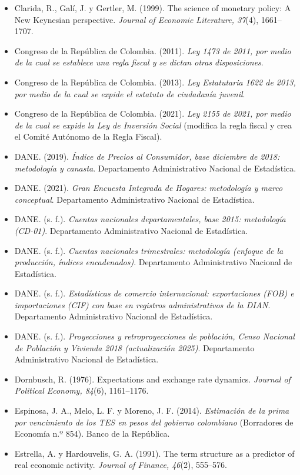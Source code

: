 \begin{itemize}[leftmargin=1.2em,itemindent=-1.2em]
\item[] Clarida, R., Galí, J. y Gertler, M. (1999). The science of monetary policy: A New Keynesian perspective. \emph{Journal of Economic Literature, 37}(4), 1661–1707.
\item[] Congreso de la República de Colombia. (2011). \emph{Ley 1473 de 2011, por medio de la cual se establece una regla fiscal y se dictan otras disposiciones}.
\item[] Congreso de la República de Colombia. (2013). \emph{Ley Estatutaria 1622 de 2013, por medio de la cual se expide el estatuto de ciudadanía juvenil}.
\item[] Congreso de la República de Colombia. (2021). \emph{Ley 2155 de 2021, por medio de la cual se expide la Ley de Inversión Social} (modifica la regla fiscal y crea el Comité Autónomo de la Regla Fiscal).
\item[] DANE. (2019). \emph{Índice de Precios al Consumidor, base diciembre de 2018: metodología y canasta}. Departamento Administrativo Nacional de Estadística.
\item[] DANE. (2021). \emph{Gran Encuesta Integrada de Hogares: metodología y marco conceptual}. Departamento Administrativo Nacional de Estadística.
\item[] DANE. (s. f.). \emph{Cuentas nacionales departamentales, base 2015: metodología (CD-01)}. Departamento Administrativo Nacional de Estadística.
\item[] DANE. (s. f.). \emph{Cuentas nacionales trimestrales: metodología (enfoque de la producción, índices encadenados)}. Departamento Administrativo Nacional de Estadística.
\item[] DANE. (s. f.). \emph{Estadísticas de comercio internacional: exportaciones (FOB) e importaciones (CIF) con base en registros administrativos de la DIAN}. Departamento Administrativo Nacional de Estadística.
\item[] DANE. (s. f.). \emph{Proyecciones y retroproyecciones de población, Censo Nacional de Población y Vivienda 2018 (actualización 2025)}. Departamento Administrativo Nacional de Estadística.
\item[] Dornbusch, R. (1976). Expectations and exchange rate dynamics. \emph{Journal of Political Economy, 84}(6), 1161–1176.
\item[] Espinosa, J. A., Melo, L. F. y Moreno, J. F. (2014). \emph{Estimación de la prima por vencimiento de los TES en pesos del gobierno colombiano} (Borradores de Economía n.º 854). Banco de la República.
\item[] Estrella, A. y Hardouvelis, G. A. (1991). The term structure as a predictor of real economic activity. \emph{Journal of Finance, 46}(2), 555–576.

\end{itemize}
